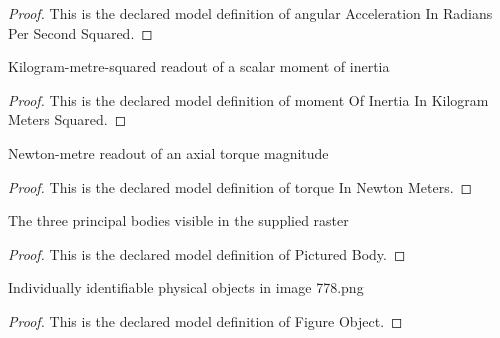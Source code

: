 \begin{proof}
  This is the declared model definition of angular Acceleration In Radians Per Second Squared.
\end{proof}
\begin{definition}
  \label{def:physics:phyx-mini-0778:phyxminiproblems-problemphyxmini0778-momentofinertiainkilogrammeterssquared}
  Kilogram-metre-squared readout of a scalar moment of inertia
\end{definition}
\begin{proof}
  This is the declared model definition of moment Of Inertia In Kilogram Meters Squared.
\end{proof}
\begin{definition}
  \label{def:physics:phyx-mini-0778:phyxminiproblems-problemphyxmini0778-torqueinnewtonmeters}
  Newton-metre readout of an axial torque magnitude
\end{definition}
\begin{proof}
  This is the declared model definition of torque In Newton Meters.
\end{proof}
\begin{definition}
  \label{def:physics:phyx-mini-0778:phyxminiproblems-problemphyxmini0778-picturedbody}
  The three principal bodies visible in the supplied raster
\end{definition}
\begin{proof}
  This is the declared model definition of Pictured Body.
\end{proof}
\begin{definition}
  \label{def:physics:phyx-mini-0778:phyxminiproblems-problemphyxmini0778-figureobject}
  Individually identifiable physical objects in image 778.png
\end{definition}
\begin{proof}
  This is the declared model definition of Figure Object.
\end{proof}
